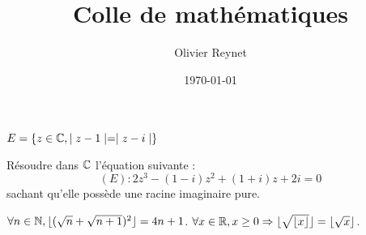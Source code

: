 \documentclass[french,12pt,a4paper]{article}
\author{Olivier Reynet}
\title{Colle de mathématiques}
\date{\today}
\begin{document}
\maketitle


\begin{exercise}[subtitle= Déterminer l'ensemble]
	$E = \{z \in \mathbb{C}, \mid z-1 \mid = \mid z - i\mid\}$
\end{exercise}

\begin{exercise}[subtitle= Résolution d'équation dans $\CC$]
	Résoudre dans $\CC$ l'équation suivante :
		$$(E) : 2z^3 -(1-i)z^2 + (1+i)z+2i=0$$ 
		sachant qu'elle possède une racine imaginaire pure. 
\end{exercise}

\begin{exercise}[subtitle= Racine carrée et  partie entière]
	\begin{tasks}
		\task \Mq $\forall n \in \mathbb{N}, \lfloor ( \sqrt{n} + \sqrt{n+1})^2 \rfloor = 4n +1$.
		\task \Mq  $\forall x \in \mathbb{R}, x \ge 0 \Rightarrow \lfloor \sqrt{\lfloor x \rfloor}\rfloor = \lfloor \sqrt{x} \rfloor$.
	\end{tasks}
\end{exercise}
\end{document}

